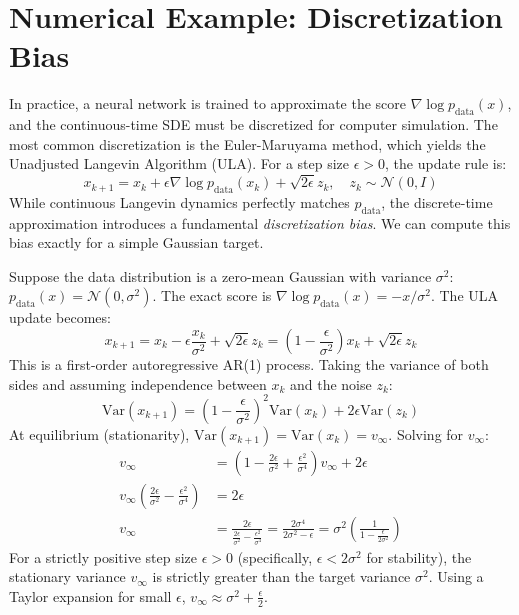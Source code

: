 \section{Numerical Example: Discretization Bias}

In practice, a neural network is trained to approximate the score $\nabla \log p_{\text{data}}(x)$, and the continuous-time SDE must be discretized for computer simulation. The most common discretization is the Euler-Maruyama method, which yields the Unadjusted Langevin Algorithm (ULA). For a step size $\epsilon > 0$, the update rule is:
\begin{equation}
    x_{k+1} = x_k + \epsilon \nabla \log p_{\text{data}}(x_k) + \sqrt{2\epsilon} z_k, \quad z_k \sim \mathcal{N}(0, I)
\end{equation}
While continuous Langevin dynamics perfectly matches $p_{\text{data}}$, the discrete-time approximation introduces a fundamental \emph{discretization bias}. We can compute this bias exactly for a simple Gaussian target.

Suppose the data distribution is a zero-mean Gaussian with variance $\sigma^2$: $p_{\text{data}}(x) = \mathcal{N}(0, \sigma^2)$. The exact score is $\nabla \log p_{\text{data}}(x) = -x / \sigma^2$. The ULA update becomes:
\begin{equation}
    x_{k+1} = x_k - \epsilon \frac{x_k}{\sigma^2} + \sqrt{2\epsilon} z_k = \left( 1 - \frac{\epsilon}{\sigma^2} \right) x_k + \sqrt{2\epsilon} z_k
\end{equation}
This is a first-order autoregressive AR(1) process. Taking the variance of both sides and assuming independence between $x_k$ and the noise $z_k$:
\begin{equation}
    \text{Var}(x_{k+1}) = \left( 1 - \frac{\epsilon}{\sigma^2} \right)^2 \text{Var}(x_k) + 2\epsilon \text{Var}(z_k)
\end{equation}
At equilibrium (stationarity), $\text{Var}(x_{k+1}) = \text{Var}(x_k) = v_\infty$. Solving for $v_\infty$:
\begin{align*}
    v_\infty &= \left( 1 - \frac{2\epsilon}{\sigma^2} + \frac{\epsilon^2}{\sigma^4} \right) v_\infty + 2\epsilon \\
    v_\infty \left( \frac{2\epsilon}{\sigma^2} - \frac{\epsilon^2}{\sigma^4} \right) &= 2\epsilon \\
    v_\infty &= \frac{2\epsilon}{\frac{2\epsilon}{\sigma^2} - \frac{\epsilon^2}{\sigma^4}} = \frac{2\sigma^4}{2\sigma^2 - \epsilon} = \sigma^2 \left( \frac{1}{1 - \frac{\epsilon}{2\sigma^2}} \right)
\end{align*}
For a strictly positive step size $\epsilon > 0$ (specifically, $\epsilon < 2\sigma^2$ for stability), the stationary variance $v_\infty$ is strictly greater than the target variance $\sigma^2$. Using a Taylor expansion for small $\epsilon$, $v_\infty \approx \sigma^2 + \frac{\epsilon}{2}$. 

